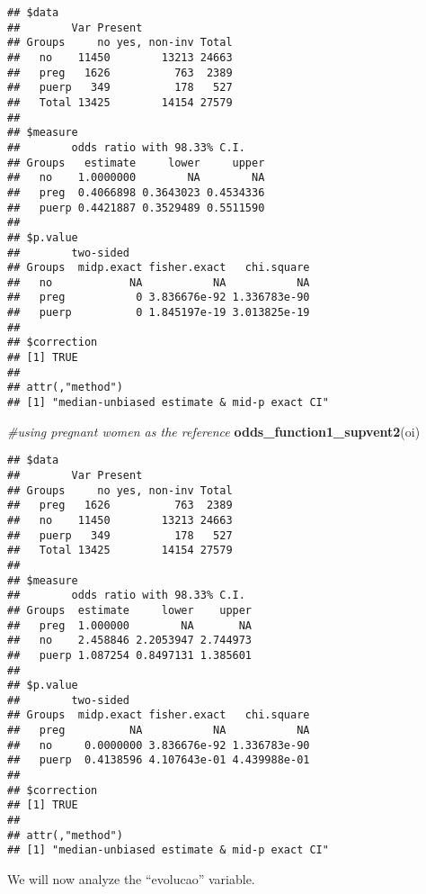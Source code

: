 \documentclass[
]{article}
\newenvironment{Shaded}{\begin{snugshade}}{\end{snugshade}}
\newcommand{\CommentTok}[1]{\textcolor[rgb]{0.56,0.35,0.01}{\textit{#1}}}
\newcommand{\DataTypeTok}[1]{\textcolor[rgb]{0.13,0.29,0.53}{#1}}
\newcommand{\KeywordTok}[1]{\textcolor[rgb]{0.13,0.29,0.53}{\textbf{#1}}}
\newcommand{\NormalTok}[1]{#1}
\newcommand{\OperatorTok}[1]{\textcolor[rgb]{0.81,0.36,0.00}{\textbf{#1}}}
\newcommand{\OtherTok}[1]{\textcolor[rgb]{0.56,0.35,0.01}{#1}}
\newcommand{\StringTok}[1]{\textcolor[rgb]{0.31,0.60,0.02}{#1}}
\begin{document}
\begin{verbatim}
## $data
##        Var Present
## Groups     no yes, non-inv Total
##   no    11450        13213 24663
##   preg   1626          763  2389
##   puerp   349          178   527
##   Total 13425        14154 27579
## 
## $measure
##        odds ratio with 98.33% C.I.
## Groups   estimate     lower     upper
##   no    1.0000000        NA        NA
##   preg  0.4066898 0.3643023 0.4534336
##   puerp 0.4421887 0.3529489 0.5511590
## 
## $p.value
##        two-sided
## Groups  midp.exact fisher.exact   chi.square
##   no            NA           NA           NA
##   preg           0 3.836676e-92 1.336783e-90
##   puerp          0 1.845197e-19 3.013825e-19
## 
## $correction
## [1] TRUE
## 
## attr(,"method")
## [1] "median-unbiased estimate & mid-p exact CI"
\end{verbatim}

\begin{Shaded}
\begin{Highlighting}[]
\CommentTok{#using pregnant women as the reference}
\KeywordTok{odds_function1_supvent2}\NormalTok{(oi)}
\end{Highlighting}
\end{Shaded}

\begin{verbatim}
## $data
##        Var Present
## Groups     no yes, non-inv Total
##   preg   1626          763  2389
##   no    11450        13213 24663
##   puerp   349          178   527
##   Total 13425        14154 27579
## 
## $measure
##        odds ratio with 98.33% C.I.
## Groups  estimate     lower    upper
##   preg  1.000000        NA       NA
##   no    2.458846 2.2053947 2.744973
##   puerp 1.087254 0.8497131 1.385601
## 
## $p.value
##        two-sided
## Groups  midp.exact fisher.exact   chi.square
##   preg          NA           NA           NA
##   no     0.0000000 3.836676e-92 1.336783e-90
##   puerp  0.4138596 4.107643e-01 4.439988e-01
## 
## $correction
## [1] TRUE
## 
## attr(,"method")
## [1] "median-unbiased estimate & mid-p exact CI"
\end{verbatim}

We will now analyze the ``evolucao'' variable.

\begin{Shaded}
\end{Shaded}
\end{document}
